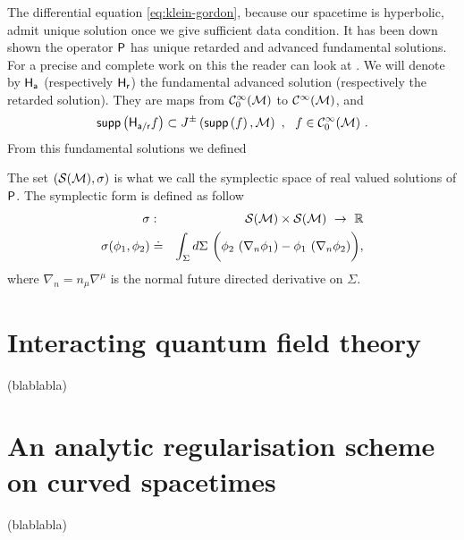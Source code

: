 The differential equation \eqref{eq:klein-gordon}, because our spacetime is hyperbolic, admit unique solution once we give sufficient data condition. It has been down shown the operator $\mathsf{P}$ has unique retarded and advanced fundamental solutions. For a precise and complete work on this the reader can look at \cite[section 3]{Bar:2007zz}. We will denote by $\mathsf{H}_{\mathsf{a}}$ (respectively $\mathsf{H}_{\mathsf{r}}$) the fundamental advanced solution (respectively the retarded solution). They are maps from $\mathcal{C}^\infty_0(\mathcal{M})$ to $\mathcal{C}^\infty(\mathcal{M})$, and%
%
\begin{equation*}
\mathsf{supp}\left( \mathsf{H}_{\mathsf{a}/\mathsf{r}} f \right) \subset J^{\pm}\left(\mathsf{supp}\left(f\right),\mathcal{M}\right) \ , \ \ f \in \mathcal{C}^\infty_0(\mathcal{M}) \ . 
\end{equation*}
%
From this fundamental solutions we defined 

\newpage
The set $\left(\mathcal{S}(\mathcal{M}),\sigma\right)$ is what we call the symplectic space of real valued solutions of $\mathsf{P}$. The symplectic form is defined as follow%
%
\begin{eqnarray}
\sigma &:& \mathcal{S}(\mathcal{M}) \times \mathcal{S}(\mathcal{M}) \ \to \ \mathbb{R} \nonumber \\
\sigma(\phi_1,\phi_2) &\doteq& \int_{\Sigma} d\Sigma \ \bigg( \phi_2 \ (\nabla_n \phi_1) - \phi_1 \ (\nabla_n \phi_2) \bigg), \label{eq:sym-form}
\end{eqnarray}
where $\nabla_n = n_\mu \nabla^\mu$ is the normal future directed derivative on $\Sigma$.








\chapter{Interacting quantum field theory} \label{chp:intQFT}

(blablabla)

\chapter{An analytic regularisation scheme on curved spacetimes} \label{chp:reg-sheme}

(blablabla) 
\cite{Gere:2015qsa}







